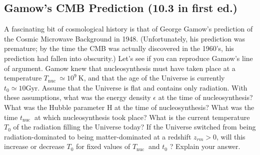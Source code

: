 \subsection{}
\subsection*{Gamow's CMB Prediction (10.3 in first ed.)}
\begin{tcolorbox}
    A fascinating bit of cosmological history is that of George Gamow's prediction of the Cosmic Microwave Background in 1948. (Unfortunately, his prediction was premature; by the time the CMB was actually discovered in the 1960's, his prediction had fallen into obscurity.) Let's see if you can reproduce Gamow's line of argument. Gamow knew that nucleosynthesis must have taken place at a temperature $T_{\text {nuc }} \simeq 10^{9} \mathrm{~K}$, and that the age of the Universe is currently $t_{0} \simeq 10 \mathrm{Gyr}$. Assume that the Universe is flat and contains only radiation. With these assumptions, what was the energy density $\epsilon$ at the time of nucleosynthesis? What was the Hubble parameter $\mathrm{H}$ at the time of nucleosynthesis? What was the time $t_{\text {nuc }}$ at which nucleosynthesis took place? What is the current temperature $T_{0}$ of the radiation filling the Universe today? If the Universe switched from being radiation-dominated to being matter-dominated at a redshift $z_{r m}>0$, will this increase or decrease $T_{0}$ for fixed values of $T_{\text {nuc }}$ and $t_{0}$ ? Explain your answer.
\end{tcolorbox}